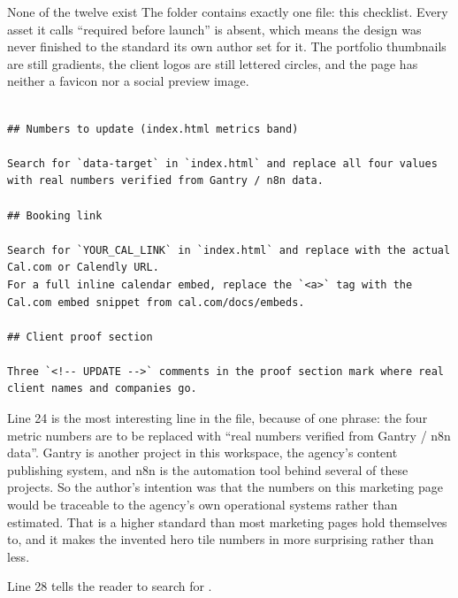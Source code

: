 \begin{honest}{None of the twelve exist}
The  folder contains exactly one file: this checklist. Every asset it
calls ``required before launch'' is absent, which means the design was never
finished to the standard its own author set for it. The portfolio thumbnails are
still gradients, the client logos are still lettered circles, and the page has
neither a favicon nor a social preview image.
\end{honest}

\begin{lstlisting}[firstnumber=21,caption={\file{ASSETS.md}, lines 21--33}]

## Numbers to update (index.html metrics band)

Search for `data-target` in `index.html` and replace all four values with real numbers verified from Gantry / n8n data.

## Booking link

Search for `YOUR_CAL_LINK` in `index.html` and replace with the actual Cal.com or Calendly URL.
For a full inline calendar embed, replace the `<a>` tag with the Cal.com embed snippet from cal.com/docs/embeds.

## Client proof section

Three `<!-- UPDATE -->` comments in the proof section mark where real client names and companies go.
\end{lstlisting}

Line 24 is the most interesting line in the file, because of one phrase: the four
metric numbers are to be replaced with ``real numbers verified from Gantry / n8n
data''. Gantry is another project in this workspace, the agency's content
publishing system, and n8n is the automation tool behind several of these projects.
So the author's intention was that the numbers on this marketing page would be
traceable to the agency's own operational systems rather than estimated. That is a
higher standard than most marketing pages hold themselves to, and it makes the
invented hero tile numbers in  more surprising rather than less.

Line 28 tells the reader to search for .

